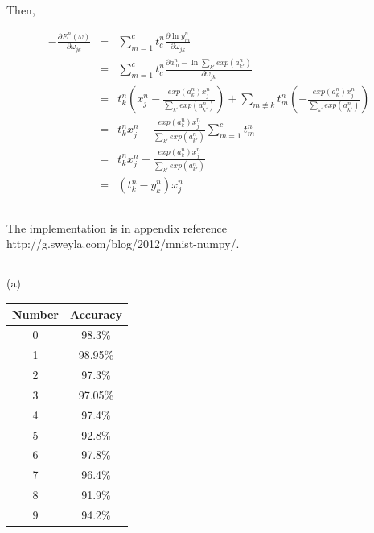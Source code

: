 \documentclass{article} %
\begin{document}
Then,

\begin{equation}
    \begin{array}{rcl}
      	 - \frac{\partial{E^n (\omega)} } { \partial{\omega_{jk}} } & = 
	 & \sum\limits_{m = 1}^{c} t_c^n \frac{\partial{\ln{y_m^n}} } {\partial{\omega_{jk}}} \\
	 & = &  \sum\limits_{m = 1}^{c} t_c^n \frac{\partial{  a_m^n - \ln{\sum_{k'} exp(a_{k'}^n)} } } {\partial{\omega_{jk}}} \\
	 & = & t_k^n(x_j^n - \frac{ exp(a_k^n) x_j^n}{ \sum_{k'} exp(a_{k'}^n) }  ) + \sum\limits_{m \not\equiv k} t_m^n(- \frac{ exp(a_k^n) x_j^n}{ \sum_{k'} exp(a_{k'}^n) } ) \\
	 & = & t_k^n x_j^n - \frac{ exp(a_k^n) x_j^n}{ \sum_{k'} exp(a_{k'}^n) }  \sum\limits_{m=1}^{c} t_m^n \\
	 & = & t_k^n x_j^n - \frac{ exp(a_k^n) x_j^n}{ \sum_{k'} exp(a_{k'}^n) }  \\
	 & = & (t_k^n - y _k^n) x_j^n
    \end{array}
\end{equation}

\subsection{}
The implementation is in appendix reference http://g.sweyla.com/blog/2012/mnist-numpy/.


\subsection{}
(a) \\

\begin{center}

\begin{tabular}{ | c | c |}
  \hline			
  Number & Accuracy \\ \hline
  0 & 98.3\% \\ \hline
  1 & 98.95\% \\ \hline
  2 & 97.3\% \\ \hline
  3 & 97.05\% \\ \hline
  4 & 97.4\% \\ \hline
  5 & 92.8\% \\ \hline
  6 & 97.8\% \\ \hline
  7 & 96.4\% \\ \hline
  8 & 91.9\% \\ \hline
  9 & 94.2\% \\ \hline

\end{tabular}

\end{center}
\end{document}
